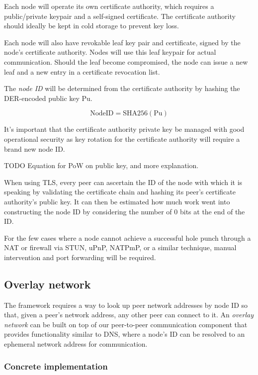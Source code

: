 \documentclass[a4paper,10pt]{article} \usepackage[utf8]{inputenc}
\newcommand{\todo}[1]{{\color{red} TODO #1 }}
\begin{document}
Each node will operate its own certificate authority, which requires a
public/private keypair and a self-signed certificate. The certificate authority
should ideally be kept in cold storage to prevent key loss.

Each node will also have revokable leaf key pair and certificate, signed by
the node's certificate authority. Nodes will use this leaf keypair for actual
communication. Should the leaf become compromised, the node can issue a new
leaf and a new entry in a certificate revocation list.

The {\em node ID} will be determined from the certificate authority
by hashing the DER-encoded public key Pu.

\begin{equation}
\text{NodeID} = \text{SHA256}(\text{Pu})
\end{equation}

It's important that the certificate authority private key be managed with good
operational security as key rotation for the certificate authority will require
a brand new node ID.

\todo {Equation for PoW on public key, and more explanation.}

When using TLS, every peer can ascertain the ID of the node with which it is
speaking by validating the certificate chain and hashing its peer's
certificate authority's public key. It can then be estimated how much work went
into constructing the node ID by considering the number of 0 bits at the end of
the ID.

For the few cases where a node cannot achieve a successful hole punch through a
NAT or firewall via STUN, uPnP, NATPmP, or a similar technique, manual
intervention and port forwarding will be required.

\subsection{Overlay network}
The framework requires a way to look up peer network addresses by node ID
so that, given a peer's network address, any other peer can connect to it.
An {\em overlay network} can be built on top of our peer-to-peer
communication component that provides functionality similar to DNS, where a
node's ID can be resolved to an ephemeral network address for communication.

\subsubsection{Concrete implementation}
\end{document}
